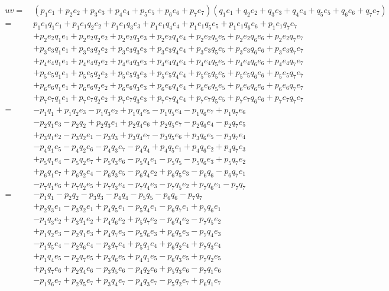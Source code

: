 \documentclass[a4paper,12pt,notitlepage]{jsreport}
\begin{document}
\begin{equation}
  \begin{split}
    uv=~&(p_1e_1+p_2e_2+p_3e_3+p_4e_4+p_5e_5+p_6e_6+p_7e_7)(q_1e_1+q_2e_2+q_3e_3+q_4e_4+q_5e_5+q_6e_6+q_7e_7)\\
    =~&p_1e_1q_1e_1+p_1e_1q_2e_2+p_1e_1q_3e_3+p_1e_1q_4e_4+p_1e_1q_5e_5+p_1e_1q_6e_6+p_1e_1q_7e_7\\
    &+p_2e_2q_1e_1+p_2e_2q_2e_2+p_2e_2q_3e_3+p_2e_2q_4e_4+p_2e_2q_5e_5+p_2e_2q_6e_6+p_2e_2q_7e_7\\
    &+p_3e_3q_1e_1+p_3e_3q_2e_2+p_3e_3q_3e_3+p_3e_3q_4e_4+p_3e_3q_5e_5+p_3e_3q_6e_6+p_3e_3q_7e_7\\
    &+p_4e_4q_1e_1+p_4e_4q_2e_2+p_4e_4q_3e_3+p_4e_4q_4e_4+p_4e_4q_5e_5+p_4e_4q_6e_6+p_4e_4q_7e_7\\
    &+p_5e_5q_1e_1+p_5e_5q_2e_2+p_5e_5q_3e_3+p_5e_5q_4e_4+p_5e_5q_5e_5+p_5e_5q_6e_6+p_5e_5q_7e_7\\
    &+p_6e_6q_1e_1+p_6e_6q_2e_2+p_6e_6q_3e_3+p_6e_6q_4e_4+p_6e_6q_5e_5+p_6e_6q_6e_6+p_6e_6q_7e_7\\
    &+p_7e_7q_1e_1+p_7e_7q_2e_2+p_7e_7q_3e_3+p_7e_7q_4e_4+p_7e_7q_5e_5+p_7e_7q_6e_6+p_7e_7q_7e_7\\
    =~&-p_1q_1+p_1q_2e_3-p_1q_3e_2+p_1q_4e_5-p_1q_5e_4-p_1q_6e_7+p_1q_7e_6\\
    &-p_2q_1e_3-p_2q_2+p_2q_3e_1+p_2q_4e_6+p_2q_5e_7-p_2q_6e_4-p_2q_7e_5\\
    &+p_3q_1e_2-p_3q_2e_1-p_3q_3+p_3q_4e_7-p_3q_5e_6+p_3q_6e_5-p_3q_7e_4\\
    &-p_4q_1e_5-p_4q_2e_6-p_4q_3e_7-p_4q_4+p_4q_5e_1+p_4q_6e_2+p_4q_7e_3\\
    &+p_5q_1e_4-p_5q_2e_7+p_5q_3e_6-p_5q_4e_1-p_5q_5-p_5q_6e_3+p_5q_7e_2\\
    &+p_6q_1e_7+p_6q_2e_4-p_6q_3e_5-p_6q_4e_2+p_6q_5e_3-p_6q_6-p_6q_7e_1\\
    &-p_7q_1e_6+p_7q_2e_5+p_7q_3e_4-p_7q_4e_3-p_7q_5e_2+p_7q_6e_1-p_7q_7\\
    =~&-p_1q_1-p_2q_2-p_3q_3-p_4q_4-p_5q_5-p_6q_6-p_7q_7\\
    &+p_2q_3e_1-p_3q_2e_1+p_4q_5e_1-p_5q_4e_1-p_6q_7e_1+p_7q_6e_1\\
    &-p_1q_3e_2+p_3q_1e_2+p_4q_6e_2+p_5q_7e_2-p_6q_4e_2-p_7q_5e_2\\
    &+p_1q_2e_3-p_2q_1e_3+p_4q_7e_3-p_5q_6e_3+p_6q_5e_3-p_7q_4e_3\\
    &-p_1q_5e_4-p_2q_6e_4-p_3q_7e_4+p_5q_1e_4+p_6q_2e_4+p_7q_3e_4\\
    &+p_1q_4e_5-p_2q_7e_5+p_3q_6e_5+p_4q_1e_5-p_6q_3e_5+p_7q_2e_5\\
    &+p_1q_7e_6+p_2q_4e_6-p_3q_5e_6-p_4q_2e_6+p_5q_3e_6-p_7q_1e_6\\
    &-p_1q_6e_7+p_2q_5e_7+p_3q_4e_7-p_4q_3e_7-p_5q_2e_7+p_6q_1e_7
  \end{split}
\end{equation}
\end{document}
